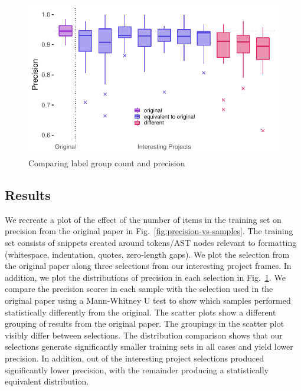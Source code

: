 \documentclass[sigconf,review,anonymous]{acmart}
\begin{document}
\begin{figure}[th]
  \includegraphics[width=\columnwidth]{../figs/style-analyzer/precision-and-samples-comparison.pdf}
  \caption{Comparing label group count and precision}\label{fig:precision-and-samples-comparison}
\end{figure}


\subsection*{Results}

We recreate a plot of the effect of the number of items in the training set on
precision from the original paper in Fig.~\ref{fig:precision-vs-samples}. The
training set consists of snippets created around tokens/AST nodes relevant to
formatting (whitespace, indentation, quotes, zero-length gaps). We plot the
selection from the original paper along three selections from our interesting
project frames.
In addition, we plot the distributions of precision in each selection in
Fig.~\ref{fig:precision-and-samples-comparison}. We compare the precision scores
in each sample with the selection used in the original paper using a
Mann-Whitney U test to show which samples performed statistically differently
from the original. %
The scatter plots show a different grouping of results from the original paper.
The groupings in the scatter plot visibly differ between selections. The
distribution comparison shows that our selections generate significantly smaller
training sets in all cases and yield lower precision. In addition,
\SADifferentSelections out of the \SAAllSelections interesting project
selections produced significantly lower precision, with the remainder producing
a statistically equivalent distribution.
\end{document}
